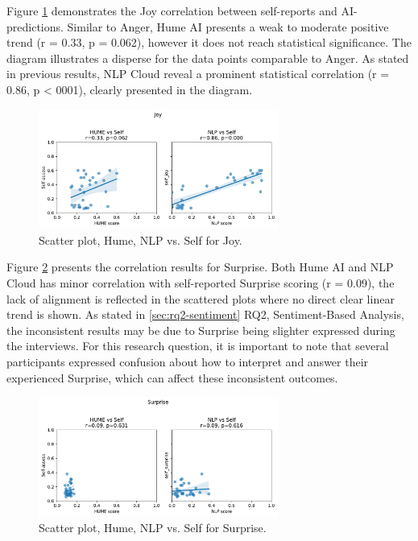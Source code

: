 Figure \ref{fig:scatter-joy-rq3} demonstrates the Joy correlation between self-reports and AI-predictions. Similar to Anger, Hume AI presents a weak to moderate positive trend (r = 0.33, p = 0.062), however it does not reach statistical significance. The diagram illustrates a disperse for the data points comparable to Anger.
As stated in previous results, NLP Cloud reveal a prominent statistical correlation (r = 0.86, p < 0001), clearly presented in the diagram. 
\begin{figure}[!h]
    \centering
    \includegraphics[width=0.7\textwidth]{png/results/rq3/scatter_joy_vs_self.pdf}
    \caption{Scatter plot, Hume, NLP vs. Self for Joy.}
    \label{fig:scatter-joy-rq3}
\end{figure}
\medskip

Figure \ref{fig:scatter-surprise-rq3} presents the correlation results for Surprise. Both Hume AI and NLP Cloud has minor correlation with self-reported Surprise scoring (r = 0.09), the lack of alignment is reflected in the scattered plots where no direct clear linear trend is shown. 
As stated in \ref{sec:rq2-sentiment} RQ2, Sentiment-Based Analysis, the inconsistent results may be due to Surprise being slighter expressed during the interviews. For this research question, it is important to note that several participants expressed confusion about how to interpret and answer 
their experienced Surprise, which can affect these inconsistent outcomes. 
\begin{figure}[!h]
    \centering
    \includegraphics[width=0.7\textwidth]{png/results/rq3/scatter_surprise_vs_self.pdf}
    \caption{Scatter plot, Hume, NLP vs. Self for Surprise.}
    \label{fig:scatter-surprise-rq3}
\end{figure}

